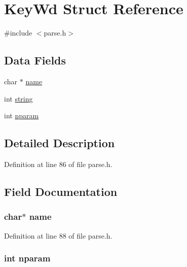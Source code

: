 \hypertarget{struct_key_wd}{\section{Key\-Wd Struct Reference}
\label{struct_key_wd}
}


{\ttfamily \#include $<$parse.\-h$>$}

\subsection*{Data Fields}
\begin{DoxyCompactItemize}
\item 
char $\ast$ \hyperlink{struct_key_wd_a5ac083a645d964373f022d03df4849c8}{name}
\item 
int \hyperlink{struct_key_wd_a6173b7d8f1e6927813745d72ea5bed19}{string}
\item 
int \hyperlink{struct_key_wd_aeed50b452b56cc987c6d92cdf5075124}{nparam}
\end{DoxyCompactItemize}


\subsection{Detailed Description}


Definition at line 86 of file parse.\-h.



\subsection{Field Documentation}
\hypertarget{struct_key_wd_a5ac083a645d964373f022d03df4849c8}{
\subsubsection[{name}]{\setlength{\rightskip}{0pt plus 5cm}char$\ast$ name}}\label{struct_key_wd_a5ac083a645d964373f022d03df4849c8}


Definition at line 88 of file parse.\-h.

\hypertarget{struct_key_wd_aeed50b452b56cc987c6d92cdf5075124}{
\subsubsection[{nparam}]{\setlength{\rightskip}{0pt plus 5cm}int nparam}}\label{struct_key_wd_aeed50b452b56cc987c6d92cdf5075124}


